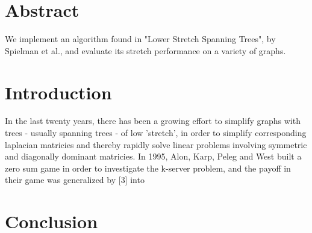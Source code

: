 \documentclass{article}
\title{\cTitle}
\author{\cAuthor}
\begin{document}
\maketitle

\section*{Abstract}
We implement an algorithm found in "Lower Stretch Spanning Trees", by Spielman et al., and evaluate its stretch performance on a variety of graphs.
\section*{Introduction}
In the last twenty years, there has been a growing effort to simplify graphs with trees - usually spanning trees - of low 'stretch', in order to simplify corresponding laplacian matricies and thereby rapidly solve linear problems involving symmetric and diagonally dominant matricies.
In 1995, Alon, Karp, Peleg and West\cite{AKPG} built a zero sum game in order to investigate the k-server problem\cite{k-server}, and the payoff in their game was generalized by [3] into 

\section*{Conclusion}
\end{document}

